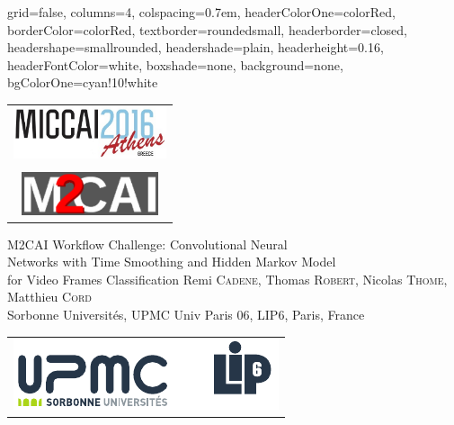 \documentclass[landscape,a0paper,fontscale=0.292]{baposter}
\begin{document}
\begin{poster}{
 grid=false,
 columns=4,
 colspacing=0.7em,
 headerColorOne=colorRed,
 borderColor=colorRed,
 textborder=roundedsmall,
 headerborder=closed,
 headershape=smallrounded,
 headershade=plain,
 headerheight=0.16\textheight,
 headerFontColor=white,
 boxshade=none,
 background=none,
 bgColorOne=cyan!10!white}
 { 
    \begin{tabular}{c}
      \hspace{0.5cm}\includegraphics[width=4.5cm]{logo/logo_miccai.png} \\ \vspace{-.2cm}
      \\
      \hspace{0.2cm}\includegraphics[width=4cm]{logo/logo_m2cai.png}
    \end{tabular}
 }
 {\sc \fontsize{0.7cm}{0.6cm}\selectfont M2CAI Workflow Challenge: Convolutional Neural \\ {\fontsize{0.7cm}{0.6cm}\selectfont Networks with Time Smoothing and Hidden Markov Model} \\ for Video Frames Classification }
 {Remi \textsc{Cadene}, Thomas \textsc{Robert}, Nicolas \textsc{Thome}, Matthieu \textsc{Cord} \vspace{0.1cm}\\
 {\small Sorbonne Universit\'{e}s, UPMC Univ Paris 06, LIP6, Paris, France}
 } %
 {
    \begin{tabular}{c}
          \hspace{-5mm}
      \includegraphics[height=0.075\textheight]{logo/logos.pdf}  \\

\end{tabular}}
\end{poster}
\end{document}
